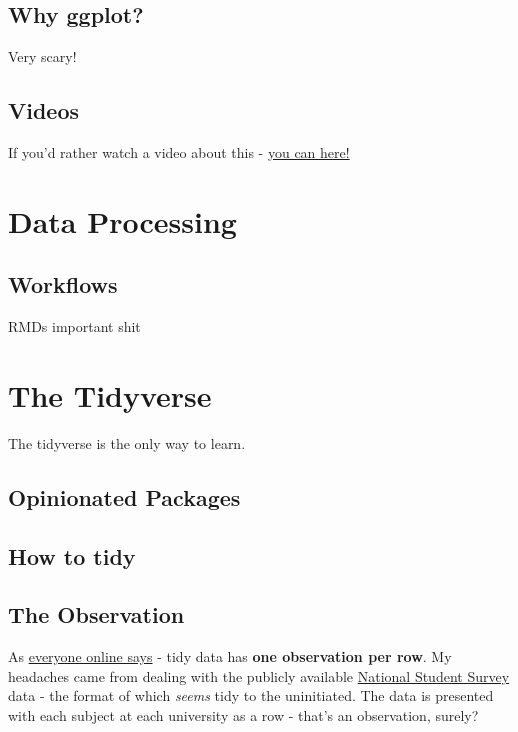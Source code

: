 \documentclass[
]{book}
\begin{document}
\hypertarget{why-ggplot}{%
\section{Why ggplot?}\label{why-ggplot}}

Very scary!

\hypertarget{gg_vids}{%
\section{Videos}\label{gg_vids}}

If you'd rather watch a video about this - \href{https://media.ed.ac.uk/media/R+ConversationsA+Demystifying+ggplot/0_sct50ue1}{you can here!}

\hypertarget{dataprocessing}{%
\chapter{Data Processing}\label{dataprocessing}}

\hypertarget{workflows}{%
\section{Workflows}\label{workflows}}

RMDs
important shit

\hypertarget{tidyverse}{%
\chapter{The Tidyverse}\label{tidyverse}}

The tidyverse is the only way to learn.

\hypertarget{tidy_opinions}{%
\section{Opinionated Packages}\label{tidy_opinions}}

\hypertarget{how_tidy}{%
\section{How to tidy}\label{how_tidy}}

\hypertarget{the-observation}{%
\section{The Observation}\label{the-observation}}

As \href{http://vita.had.co.nz/papers/tidy-data.html}{everyone online says} - tidy data has \textbf{one observation per row}. My headaches came from dealing with the publicly available \href{https://www.officeforstudents.org.uk/advice-and-guidance/student-information-and-data/national-student-survey-nss/}{National Student Survey} data - the format of which \emph{seems} tidy to the uninitiated. The data is presented with each subject at each university as a row - that's an observation, surely?
\end{document}
